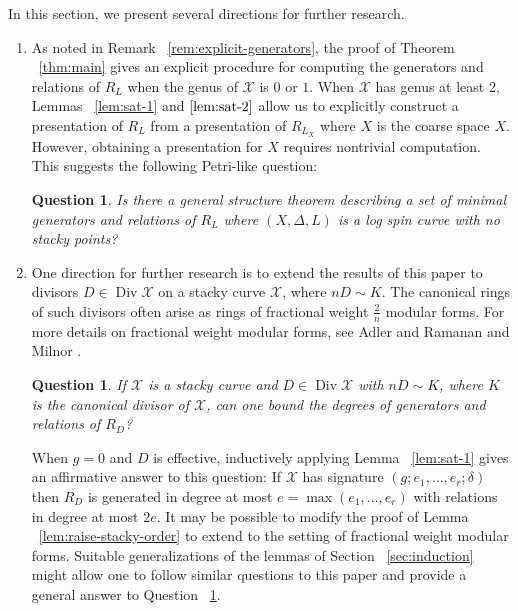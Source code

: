 \documentclass{amsart}
\theoremstyle{plain}
\newtheorem{question}[thm]{Question}
\theoremstyle{definition}
\theoremstyle{remark}
\numberwithin{equation}{section}
\DeclareMathOperator\di{Div}
\newcommand\sx{\mathscr X}
\newcommand{\halfcan}{L}
\begin{document}
In this section, we present several directions for further research.
\begin{enumerate}
	\item As noted in Remark ~\ref{rem:explicit-generators}, the 
		proof of Theorem ~\ref{thm:main} 
		gives an 
		explicit procedure for computing the generators and relations of $R_
		\halfcan$ when the genus of $\sx$ is $0$ or $1$.  When $\sx$ has genus at least 2, Lemmas ~\ref{lem:sat-1} and $\ref{lem:sat-2}$ allow us to explicitly construct a presentation of $R_\halfcan$ from a presentation of $R_{\halfcan_X}$ where $X$ is the coarse space $X$.  However, obtaining a presentation for $X$ requires nontrivial computation.  This suggests the following Petri-like question:
		\begin{question}
		\label{ques:spin-canonical-petri}
			Is there a general structure theorem describing a set of minimal 
			generators and relations of $R_{\halfcan}$ where $(X, \Delta, L)$ is a log spin curve with no stacky points?
		\end{question}
		
\item One direction for further research is to extend the results
	of this paper to divisors $D \in \di \sx$ on a stacky curve $\sx$, 
	where $nD \sim K.$ The canonical rings of such divisors often
	arise as rings of fractional weight $\frac{2}{n}$ modular forms.
	For more details on fractional weight modular forms, see Adler and
	Ramanan \cite[p. 96]{adler:moduli} and Milnor
	\cite[$\mathsection$ 6]{milnor:fractional-weight}.

\begin{question}
		\label{ques:fractional-weight}
			If $\sx$ is a stacky curve and $D \in \di \sx$ with $nD \sim K$, 
			where $K$ is the canonical divisor of $\sx$, can one bound the 
			degrees of generators and relations of $R_D$?
		\end{question}
		When $g=0$ and $D$ is effective, inductively applying Lemma ~\ref{lem:sat-1}  
		gives an affirmative answer to this question: If $\sx$ has signature 
		$(g; e_1, \ldots, e_r; \delta)$ then $R_D$ is generated in degree at 
		most $e = \max(e_1, \ldots, e_r)$ with relations in degree at most
		$2e$. 
		It may be possible to modify the proof of Lemma
		~\ref{lem:raise-stacky-order} to extend to the setting of fractional 
		weight modular forms. 
		Suitable generalizations of the 
		lemmas of Section ~\ref{sec:induction} might allow one to 
		follow similar questions to this paper and provide a general 
		answer to Question ~\ref{ques:fractional-weight}.
		\\


\end{enumerate}
\end{document}
